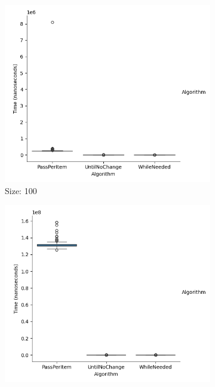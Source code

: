 \documentclass{article}
\begin{document}
\begin{figure}[ht]
  \centering
  \begin{subfigure}{0.3\textwidth}
    \centering
    \includegraphics[width=\linewidth]{../figureStringRandom100.png}
    \caption{Size: 100}
    \label{fig:img1}
  \end{subfigure}
  \begin{subfigure}{0.3\textwidth}
    \centering
    \includegraphics[width=\linewidth]{../figureStringRandom1000.png}

\end{subfigure}
\end{figure}
\end{document}
